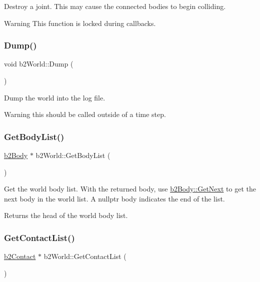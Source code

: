 Destroy a joint. This may cause the connected bodies to begin colliding. \begin{DoxyWarning}{Warning}
This function is locked during callbacks. 
\end{DoxyWarning}
\mbox{\label{classb2_world_a73c1fec260d460514edd335d4c235893}} 
\subsubsection{\texorpdfstring{Dump()}{Dump()}}
{\footnotesize\ttfamily void b2\+World\+::\+Dump (\begin{DoxyParamCaption}{ }\end{DoxyParamCaption})}

Dump the world into the log file. \begin{DoxyWarning}{Warning}
this should be called outside of a time step. 
\end{DoxyWarning}
\mbox{\label{classb2_world_a1b87c03955e3312d308ddf679adf3c85}} 
\subsubsection{\texorpdfstring{Get\+Body\+List()}{GetBodyList()}}
{\footnotesize\ttfamily \hyperlink{classb2_body}{b2\+Body} $\ast$ b2\+World\+::\+Get\+Body\+List (\begin{DoxyParamCaption}{ }\end{DoxyParamCaption})\hspace{0.3cm}{\ttfamily [inline]}}

Get the world body list. With the returned body, use \hyperlink{classb2_body_ad54182a11d02362b027a0eb072775bdc}{b2\+Body\+::\+Get\+Next} to get the next body in the world list. A nullptr body indicates the end of the list. \begin{DoxyReturn}{Returns}
the head of the world body list. 
\end{DoxyReturn}
\mbox{\label{classb2_world_ab1e1c59fd7534c0268c2a3e31370a425}} 
\subsubsection{\texorpdfstring{Get\+Contact\+List()}{GetContactList()}}
{\footnotesize\ttfamily \hyperlink{classb2_contact}{b2\+Contact} $\ast$ b2\+World\+::\+Get\+Contact\+List (\begin{DoxyParamCaption}{ }\end{DoxyParamCaption})\hspace{0.3cm}{\ttfamily [inline]}}


